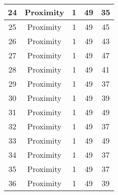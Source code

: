 \documentclass[results.tex]{subfiles}
\begin{document}
\begin{center}
\begin{tabular}{| c || c | c | c | c |}
            \hline
            24                      & Proximity                    & 1                      & 49                      & 35                   \\
            \hline
            25                      & Proximity                    & 1                      & 49                      & 45                   \\
            \hline
            26                      & Proximity                    & 1                      & 49                      & 43                   \\
            \hline
            27                      & Proximity                    & 1                      & 49                      & 47                   \\
            \hline
            28                      & Proximity                    & 1                      & 49                      & 41                   \\
            \hline
            29                      & Proximity                    & 1                      & 49                      & 37                   \\
            \hline
            30                      & Proximity                    & 1                      & 49                      & 39                   \\
            \hline
            31                      & Proximity                    & 1                      & 49                      & 49                   \\
            \hline
            32                      & Proximity                    & 1                      & 49                      & 37                   \\
            \hline
            33                      & Proximity                    & 1                      & 49                      & 49                   \\
            \hline
            34                      & Proximity                    & 1                      & 49                      & 37                   \\
            \hline
            35                      & Proximity                    & 1                      & 49                      & 37                   \\
            \hline
            36                      & Proximity                    & 1                      & 49                      & 39                   \\

\end{tabular}
\end{center}
\end{document}
